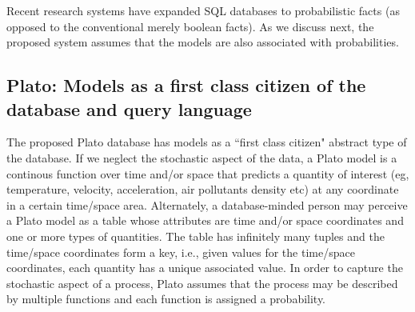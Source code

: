 Recent research systems have expanded SQL databases to probabilistic facts (as opposed to the conventional merely boolean facts). As we discuss next, the proposed system assumes that the models are also associated with probabilities.


\subsection{Plato: Models as a first class citizen of the database and query language}
\label{sec:plato}
The proposed Plato database has models as a ``first class citizen" abstract type of the database. If we neglect the stochastic aspect of the data, a Plato model is a continous function over time and/or space that predicts a quantity of interest (eg, temperature, velocity, acceleration, air pollutants density etc) at any coordinate in a certain time/space area. Alternately, a database-minded person may perceive a Plato model as a table whose attributes are time and/or space coordinates and one or more types of quantities. The table has infinitely many tuples and the time/space coordinates form a key, i.e.,  given values for the time/space coordinates, each quantity has a unique associated value. 
In order to capture the stochastic aspect of a process, Plato assumes that the process may be described by multiple functions and each function is assigned a probability.


